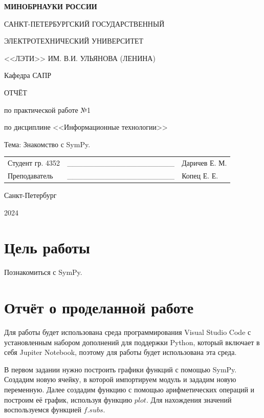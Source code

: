 \documentclass[14pt,a4paper]{extarticle}
\begin{document}
\begin{titlepage}
    \begin{center}
        {\bfseries
        МИНОБРНАУКИ РОССИИ\par
        САНКТ-ПЕТЕРБУРГСКИЙ ГОСУДАРСТВЕННЫЙ\par
        ЭЛЕКТРОТЕХНИЧЕСКИЙ УНИВЕРСИТЕТ\par
        <<ЛЭТИ>> ИМ. В.И. УЛЬЯНОВА (ЛЕНИНА)\par
        Кафедра САПР

        \vspace{0.23\textheight}
        ОТЧЁТ\par
        по практической работе №1\par
        по дисциплине <<Информационные технологии>>\par
        Тема: Знакомство с SymPy.
        \vspace{0.28\textheight}
        }
        \begin{table}[h!]
            \begin{tabularx}{\textwidth}{p{60mm}X>{\centering\arraybackslash}p{45mm}}
                Студент гр. 4352 & \_\_\_\_\_\_\_\_\_\_\_\_\_\_\_\_\_\_\_\_ & {Даричев Е. М.} \\ [5.4mm]  %
                Преподаватель    & \_\_\_\_\_\_\_\_\_\_\_\_\_\_\_\_\_\_\_\_ & {Копец Е. Е.} \\ [5.4mm]
            \end{tabularx}
        \end{table}

        Санкт-Петербург\par
        2024
    \end{center}
\end{titlepage}
\setcounter{page}{2}

\section*{Цель работы}
Познакомиться с SymPy.

\section*{Отчёт о проделанной работе}
Для работы будет использована среда программирования Visual Studio
Code с установленным набором дополнений для поддержки Python, который
включает в себя Jupiter Notebook, поэтому для работы будет использована
эта среда.

В первом задании нужно построить графики функций с помощью SymPy.
Создадим новую ячейку, в которой импортируем модуль и зададим новую
переменную. Далее создадим функцию с помощью арифметических операций и
построим её график, используя функцию $plot$. Для нахождения значений
воспользуемся функцией $f.subs$.
\end{document}
